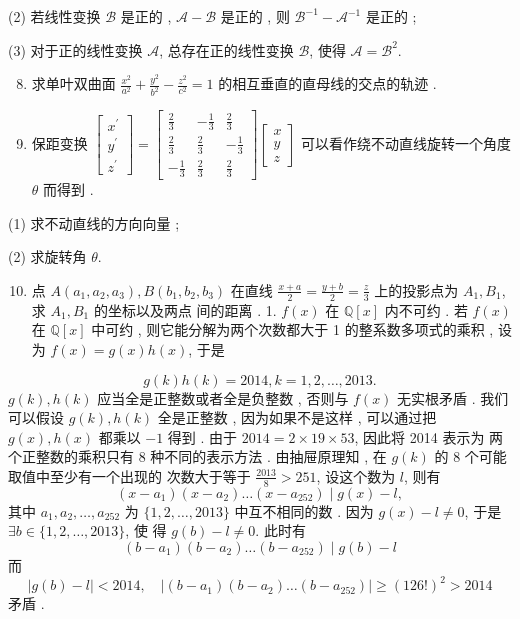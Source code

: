 \documentclass[10pt]{article}
\begin{document}
(2)  若线性变换  $\mathcal{B}$  是正的 , $\mathcal{A}-\mathcal{B}$  是正的 ,  则  $\mathcal{B}^{-1}-\mathcal{A}^{-1}$  是正的 ;

(3)  对于正的线性变换  $\mathcal{A}$,  总存在正的线性变换  $\mathcal{B}$,  使得  $\mathcal{A}=\mathcal{B}^{2}$.

\begin{enumerate}
  \setcounter{enumi}{7}
  \item  求单叶双曲面  $\frac{x^{2}}{a^{2}}+\frac{y^{2}}{b^{2}}-\frac{z^{2}}{c^{2}}=1$  的相互垂直的直母线的交点的轨迹 .

  \item  保距变换  $\left[\begin{array}{l}x^{\prime} \\ y^{\prime} \\ z^{\prime}\end{array}\right]=\left[\begin{array}{rrr}\frac{2}{3} & -\frac{1}{3} & \frac{2}{3} \\ \frac{2}{3} & \frac{2}{3} & -\frac{1}{3} \\ -\frac{1}{3} & \frac{2}{3} & \frac{2}{3}\end{array}\right]\left[\begin{array}{l}x \\ y \\ z\end{array}\right]$  可以看作绕不动直线旋转一个角度  $\theta$  而得到 .

\end{enumerate}
(1)  求不动直线的方向向量 ;

(2)  求旋转角  $\theta$.

\begin{enumerate}
  \setcounter{enumi}{9}
  \item  点  $A\left(a_{1}, a_{2}, a_{3}\right), B\left(b_{1}, b_{2}, b_{3}\right)$  在直线  $\frac{x+a}{2}=\frac{y+b}{2}=\frac{z}{3}$  上的投影点为  $A_{1}, B_{1}$,  求  $A_{1}, B_{1}$  的坐标以及两点   间的距离 . 1. $f(x)$  在  $\mathbb{Q}[x]$  内不可约 .  若  $f(x)$  在  $\mathbb{Q}[x]$  中可约 ,  则它能分解为两个次数都大于  1  的整系数多项式的乘积 ,  设为  $f(x)=g(x) h(x)$,  于是 
\end{enumerate}
$$
g(k) h(k)=2014, k=1,2, \ldots, 2013 .
$$
$g(k), h(k)$  应当全是正整数或者全是负整数 ,  否则与  $f(x)$  无实根矛盾 .  我们可以假设  $g(k), h(k)$  全是正整数 ,  因为如果不是这样 ,  可以通过把  $g(x), h(x)$  都乘以  $-1$  得到 .  由于  $2014=2 \times 19 \times 53$,  因此将  2014  表示为   两个正整数的乘积只有  8  种不同的表示方法 .  由抽屉原理知 ,  在  $g(k)$  的  8  个可能取值中至少有一个出现的   次数大于等于  $\frac{2013}{8}>251$,  设这个数为  $l$,  则有 
$$
\left(x-a_{1}\right)\left(x-a_{2}\right) \ldots\left(x-a_{252}\right) \mid g(x)-l,
$$
 其中  $a_{1}, a_{2}, \ldots, a_{252}$  为  $\{1,2, \ldots, 2013\}$  中互不相同的数 .  因为  $g(x)-l \neq 0$,  于是  $\exists b \in\{1,2, \ldots, 2013\}$,  使   得  $g(b)-l \neq 0$.  此时有 
$$
\left(b-a_{1}\right)\left(b-a_{2}\right) \ldots\left(b-a_{252}\right) \mid g(b)-l
$$
 而 
$$
|g(b)-l|<2014, \quad\left|\left(b-a_{1}\right)\left(b-a_{2}\right) \ldots\left(b-a_{252}\right)\right| \geqslant(126 !)^{2}>2014
$$
 矛盾 .
\end{document}
